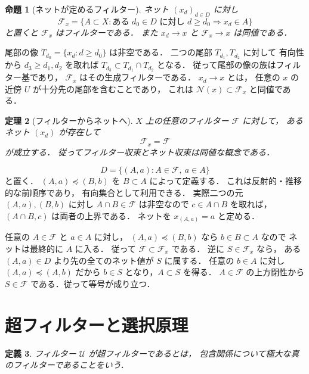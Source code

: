 \documentclass[a5paper,10pt,onecolumn]{jsarticle}
\makeatletter
\theoremstyle{mathnotetheorem}
\newtheorem{theorem}{定理}[section]
\newtheorem{definition}[theorem]{定義}
\newtheorem{proposition}[theorem]{命題}
\renewcommand{\proofname}{証明}
\renewenvironment{proof}[1][\proofname]{%
  \par\pushQED{\qed}\normalfont\topsep4\p@\@plus2\p@\relax
  \trivlist\item[\hskip\labelsep\bfseries #1]\ignorespaces
}{\popQED\endtrivlist\@endpefalse}
\makeatother
\begin{document}
\begin{proposition}[ネットが定めるフィルター]\label{prop:net-filter}
ネット $(x_d)_{d\in D}$ に対し
\[
 \mathcal F_x=
 \{A\subset X:\text{ある }d_0\in D
 \text{ に対し }d\ge d_0\Rightarrow x_d\in A\}
\]
と置くと $\mathcal F_x$ はフィルターである．
また $x_d\to x$ と $\mathcal F_x\to x$ は同値である．
\end{proposition}
\begin{proof}
尾部の像
$T_{d_0}=\{x_d:d\ge d_0\}$ は非空である．
二つの尾部 $T_{d_1},T_{d_2}$ に対して
有向性から $d_3\ge d_1,d_2$ を取れば
$T_{d_3}\subset T_{d_1}\cap T_{d_2}$ となる．
従って尾部の像の族はフィルター基であり，
$\mathcal F_x$ はその生成フィルターである．
$x_d\to x$ とは，
任意の $x$ の近傍 $U$ が十分先の尾部を含むことであり，
これは $\mathcal N(x)\subset\mathcal F_x$ と同値である．
\end{proof}

\begin{theorem}[フィルターからネットへ]\label{thm:filter-net}
$X$ 上の任意のフィルター $\mathcal F$ に対して，
あるネット $(x_d)$ が存在して
\[
 \mathcal F_x=\mathcal F
\]
が成立する．
従ってフィルター収束とネット収束は同値な概念である．
\end{theorem}
\begin{proof}
\[
 D=\{(A,a):A\in\mathcal F,\ a\in A\}
\]
と置く．
$(A,a)\preceq(B,b)$ を $B\subset A$ によって定義する．
これは反射的・推移的な前順序であり，
有向集合として利用できる．
実際二つの元 $(A,a),(B,b)$ に対し
$A\cap B\in\mathcal F$ は非空なので
$c\in A\cap B$ を取れば，
$(A\cap B,c)$ は両者の上界である．
ネットを $x_{(A,a)}=a$ と定める．

任意の $A\in\mathcal F$ と $a\in A$ に対し，
$(A,a)\preceq(B,b)$ なら $b\in B\subset A$ なので
ネットは最終的に $A$ に入る．
従って $\mathcal F\subset\mathcal F_x$ である．
逆に $S\in\mathcal F_x$ なら，
ある $(A,a)\in D$ より先の全てのネット値が
$S$ に属する．
任意の $b\in A$ に対し $(A,a)\preceq(A,b)$ だから
$b\in S$ となり，$A\subset S$ を得る．
$A\in\mathcal F$ の上方閉性から
$S\in\mathcal F$ である．従って等号が成り立つ．
\end{proof}

\section{超フィルターと選択原理}

\begin{definition}
フィルター $\mathcal U$ が\emph{超フィルター}であるとは，
包含関係について極大な真のフィルターであることをいう．
\end{definition}
\end{document}
